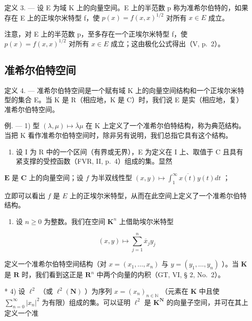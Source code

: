 定义 3. --- 设 E 为域 K 上的向量空间。E 上的半范数 p 称为准希尔伯特的，如果存在 E 上的正埃尔米特型 f，使 \(p(x) = f(x, x)^{1/2}\) 对所有 \(x \in E\) 成立。

注意，对 E 上的半范数 p，至多存在一个正埃尔米特型 f，使 \(p(x) = f(x, x)^{1/2}\) 对所有 \(x \in E\) 成立；这由极化公式得出（V, p.~2）。

\subsection{准希尔伯特空间}

定义 4. --- 准希尔伯特空间是一个赋有域 K 上的向量空间结构和一个正埃尔米特型的集合 E。当 K 是 R（相应地，K 是 C）时，我们说 E 是实（相应地，复）准希尔伯特空间。

例. --- 1) 型 \((\lambda, \mu) \mapsto \overline{\lambda}\mu\) 在 K 上定义了一个准希尔伯特结构，称为典范结构。当把 K 看作准希尔伯特空间时，除非另有说明，我们总指它具有这个结构。

\begin{enumerate}
\def\labelenumi{\arabic{enumi})}
\setcounter{enumi}{1}
\tightlist
\item
  设 I 为 R 中的一个区间（有界或无界），E 为定义在 I 上、取值于 C 且具有紧支撑的受控函数（FVR, II, p.~4）组成的集。显然
\end{enumerate}

\(\mathbf{E}\) 是 \(\mathbf{C}\) 上的向量空间；设 \(f\) 为半双线性型 \((x, y) \mapsto \int_{1}^{\infty} \overline{x(t)} y(t) dt\) ；

立即可以看出 \(f\) 是 \(E\) 上的正埃尔米特型，从而在此空间上定义了一个准希尔伯特结构。

\begin{enumerate}
\def\labelenumi{\arabic{enumi})}
\setcounter{enumi}{2}
\tightlist
\item
  设 \(n \geqslant 0\) 为整数。我们在空间 \(\mathbf{K}^n\) 上借助埃尔米特型
\end{enumerate}

\[
(x, y) \mapsto \sum_ {j = 1} ^ {n} \overline {{{{x}}}} _ {j} y _ {j}
\]

定义一个准希尔伯特空间结构（对 \(x = (x_{1}, \ldots, x_{n})\) 与 \(y = (y_{1}, \ldots, y_{n})\) ）。当 \(\mathbf{K}\) 是 \(\mathbf{R}\) 时，我们看到这正是 \(\mathbf{R}^{n}\) 中两个向量的内积（GT, VI, § 2, No.~2）。

* 4) 设 \(\ell^2\) （或 \(\ell^2(\mathbf{N})\) ）为序列 \(x = (x_n)_{n \in \mathbb{N}}\) （元素在 \(\mathbf{K}\) 中且使 \(\sum_{n=0}^{\infty} |x_n|^2\) 为有限）组成的集。可以证明 \(\ell^2\) 是 \(\mathbf{K}^{\mathbf{N}}\) 的向量子空间，并可在其上定义一个准

